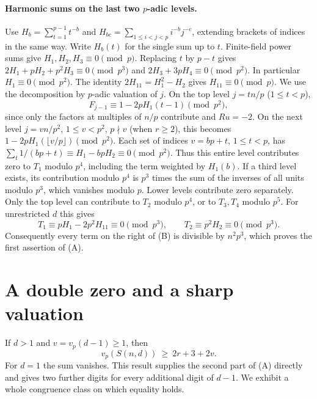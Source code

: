 \documentclass[11pt,a4paper]{article}
\numberwithin{equation}{section}
\begin{document}
\paragraph{Harmonic sums on the last two $p$-adic levels.}
Use $H_b=\sum_{t=1}^{p-1} t^{-b}$ and
$H_{bc}=\sum_{1\le i<j<p}i^{-b}j^{-c}$, extending brackets of indices
in the same way. Write $H_b(t)$ for the single sum up to $t$.
Finite-field power sums give $H_1,H_2,H_3\equiv0\pmod p$. Replacing
$t$ by $p-t$ gives $2H_1+pH_2+p^2H_3\equiv0\pmod{p^3}$ and
$2H_3+3pH_4\equiv0\pmod{p^2}$. In particular $H_1\equiv0\pmod{p^2}$.
The identity $2H_{11}=H_1^2-H_2$ gives $H_{11}\equiv0\pmod p$.
We use the decomposition by $p$-adic valuation of $j$. On the top level
$j=t n/p$ ($1\le t<p$),
\[
 F_{j-1}\equiv1-2pH_1(t-1)\pmod{p^2},
\]
since only the factors at multiples of $n/p$ contribute and $Ru=-2$.
On the next level $j=v n/p^2$, $1\le v<p^2$, $p\nmid v$ (when $r\ge2$),
this becomes $1-2pH_1(\lfloor v/p\rfloor)\pmod{p^2}$.
Each set of indices $v=bp+t$, $1\le t<p$, has
$\sum_t1/(bp+t)\equiv H_1-bpH_2\equiv0\pmod{p^2}$.
Thus this entire level contributes zero to $T_1$ modulo $p^4$,
including the term weighted by $H_1(b)$. If a third level exists,
its contribution modulo $p^4$ is $p^3$ times the sum of the inverses of
all units modulo $p^3$, which vanishes modulo $p$. Lower levels contribute
zero separately. Only the top level can contribute to $T_2$ modulo $p^4$,
or to $T_3,T_4$ modulo $p^5$.
For unrestricted $d$ this gives
\[
 T_1\equiv pH_1-2p^2 H_{11}\equiv0\pmod{p^3},\qquad
 T_2\equiv p^2H_2\equiv0\pmod{p^3}.
\]
Consequently every term on the right of (B) is divisible by $n^2p^3$,
which proves the first assertion of (A).


\section{A double zero and a sharp valuation}
\label{sec:gs-double}
If $d>1$ and $v=v_p(d-1)\ge1$, then
\begin{equation}\label{eq:gs-doublezero}
 v_p(S(n,d))\ \ge\ 2r+3+2v.
\end{equation}
For $d=1$ the sum vanishes. This result supplies the second part of
(A) directly and gives two further digits for every additional digit of
$d-1$. We exhibit a whole congruence class on which equality holds.
\end{document}
